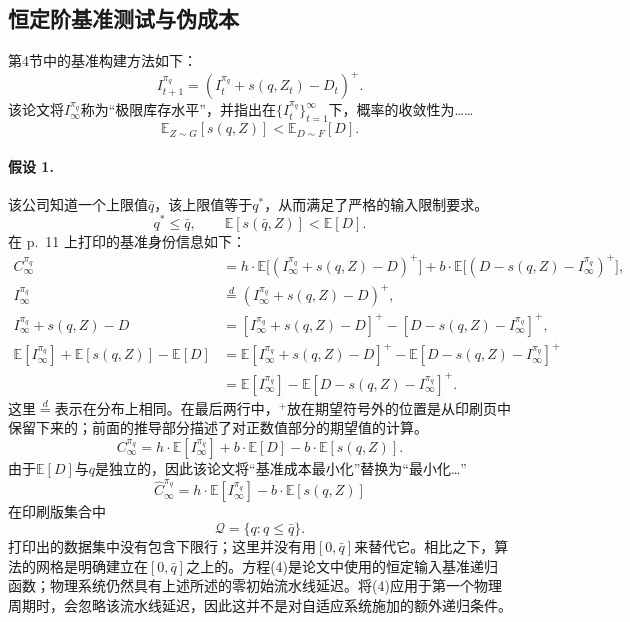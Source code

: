 \documentclass{article}
\begin{document}
\subsection*{恒定阶基准测试与伪成本}
第4节中的基准构建方法如下：
\begin{equation}
I_{t+1}^{\pi_q}=(I_t^{\pi_q}+s(q,Z_t)-D_t)^+.\tag{4}
\end{equation}
该论文将\(I_\infty^{\pi_q}\)称为“极限库存水平”，并指出在\(\{I_t^{\pi_q}\}_{t=1}^{\infty}\)下，概率的收敛性为……
\begin{equation}
\mathbb{E}_{Z\sim G}[s(q,Z)]<\mathbb{E}_{D\sim F}[D].\tag{5}
\end{equation}
\paragraph{假设 1.}
该公司知道一个上限值\(\bar q\)，该上限值等于\(q^*\)，从而满足了严格的输入限制要求。
\[
q^*\leq\bar q,\qquad \mathbb{E}[s(\bar q,Z)]<\mathbb{E}[D].
\]
在 p.\ 11 上打印的基准身份信息如下：
\begin{align*}
C_\infty^{\pi_q}
&=h\cdot\mathbb{E}\big[(I_\infty^{\pi_q}+s(q,Z)-D)^+\big]
+b\cdot\mathbb{E}\big[(D-s(q,Z)-I_\infty^{\pi_q})^+\big],\\
I_\infty^{\pi_q}
&\overset{d}{=}(I_\infty^{\pi_q}+s(q,Z)-D)^+,\\
I_\infty^{\pi_q}+s(q,Z)-D
&=[I_\infty^{\pi_q}+s(q,Z)-D]^+
-[D-s(q,Z)-I_\infty^{\pi_q}]^+,\\
\mathbb{E}[I_\infty^{\pi_q}]+\mathbb{E}[s(q,Z)]-\mathbb{E}[D]
&=\mathbb{E}[I_\infty^{\pi_q}+s(q,Z)-D]^+
-\mathbb{E}[D-s(q,Z)-I_\infty^{\pi_q}]^+\\
&=\mathbb{E}[I_\infty^{\pi_q}]
-\mathbb{E}[D-s(q,Z)-I_\infty^{\pi_q}]^+.
\end{align*}
这里\(\overset d=\)表示在分布上相同。在最后两行中，\({}^+\)放在期望符号外的位置是从印刷页中保留下来的；前面的推导部分描述了对正数值部分的期望值的计算。
\begin{equation}
C_\infty^{\pi_q}
=h\cdot\mathbb{E}[I_\infty^{\pi_q}]
+b\cdot\mathbb{E}[D]-b\cdot\mathbb{E}[s(q,Z)].\tag{6}
\end{equation}
由于\(\mathbb{E}[D]\)与\(q\)是独立的，因此该论文将“基准成本最小化”替换为“最小化…”
\begin{equation}
\hat C_\infty^{\pi_q}
=h\cdot\mathbb{E}[I_\infty^{\pi_q}]
-b\cdot\mathbb{E}[s(q,Z)]\tag{7}
\end{equation}
在印刷版集合中
\[
\mathcal Q=\{q:q\leq\bar q\}.
\]
打印出的数据集中没有包含下限行；这里并没有用\([0,\bar q]\)来替代它。相比之下，算法的网格是明确建立在\([0,\bar q]\)之上的。方程(4)是论文中使用的恒定输入基准递归函数；物理系统仍然具有上述所述的零初始流水线延迟。将(4)应用于第一个物理周期时，会忽略该流水线延迟，因此这并不是对自适应系统施加的额外递归条件。
\end{document}
